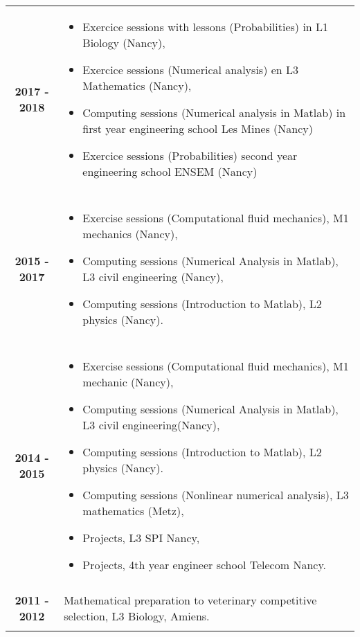 \documentclass[10pt,a4paper]{report}
\begin{document}
\noindent
\begin{center}
\begin{tabular}{c p{12cm}}
\textbf{2017 - 2018} & \begin{itemize}
\item Exercice sessions with lessons (Probabilities) in L1 Biology (Nancy),
\item Exercice sessions (Numerical analysis) en L3 Mathematics (Nancy),
\item Computing sessions (Numerical analysis in Matlab) in first year engineering school Les Mines (Nancy)
\item Exercice sessions (Probabilities) second year engineering school ENSEM (Nancy)
\end{itemize}\\

& \\

\textbf{2015 - 2017} & \begin{itemize}
\item Exercise sessions (Computational fluid mechanics), M1 mechanics (Nancy),
\item Computing sessions (Numerical Analysis in Matlab), L3 civil engineering (Nancy),
\item Computing sessions (Introduction to Matlab), L2 physics (Nancy).
\end{itemize}\\

& \\

\textbf{2014 - 2015} & \begin{itemize}
\item Exercise sessions (Computational fluid mechanics), M1 mechanic (Nancy),
\item Computing sessions (Numerical Analysis in Matlab), L3 civil engineering(Nancy),
\item Computing sessions (Introduction to Matlab), L2 physics (Nancy).
\item Computing sessions (Nonlinear numerical analysis), L3 mathematics (Metz),
\item Projects, L3 SPI Nancy,
\item Projects, 4th year engineer school Telecom Nancy.
\end{itemize}\\

& \\

\textbf{2011 - 2012} & Mathematical preparation to veterinary competitive selection, L3 Biology, Amiens.\\

& \\
\end{tabular}
\end{center}
\end{document}
